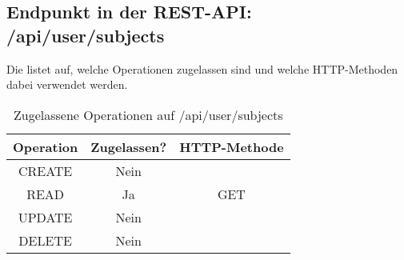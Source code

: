 \subsection{Endpunkt in der REST-API: /api/user/subjects}
Die  listet auf, welche Operationen zugelassen sind und welche HTTP-Methoden dabei verwendet werden. 

\begin{table}[!htbp]
	\begin{tabular}{|c|c|c|}
		\hline
			\textbf{Operation} & \textbf{Zugelassen?} & \textbf{HTTP-Methode} \\ \hline
			CREATE & Nein & \\ \hline 
			READ & Ja &  GET \\ \hline
			UPDATE & Nein & \\ \hline 
			DELETE & Nein & \\ \hline
	\end{tabular}

		\caption{Zugelassene Operationen auf /api/user/subjects}
		\label{tab:end:rest:api:user:subjects:meth}
\end{table}

